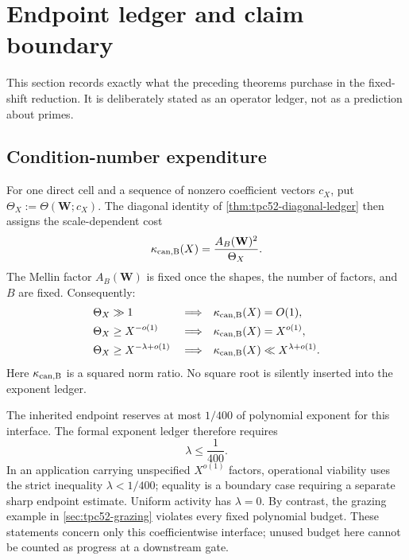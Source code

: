 \section{Endpoint ledger and claim boundary}
\label{sec:tpc52-endpoint}

This section records exactly what the preceding theorems purchase in the
fixed-shift reduction.  It is deliberately stated as an operator ledger,
not as a prediction about primes.

\subsection{Condition-number expenditure}

For one direct cell and a sequence of nonzero coefficient vectors \(c_X\),
put \(\Theta_X:=\Theta(\mathbf W;c_X)\).  The diagonal identity of
\cref{thm:tpc52-diagonal-ledger} then assigns the scale-dependent cost
\begin{equation}
 \kappa_{\rm can,B}(X)
 =\frac{A_B(\mathbf W)^2}{\Theta_X}.
 \label{eq:tpc52-endpoint-exact-cost}
\end{equation}
The Mellin factor \(A_B(\mathbf W)\) is fixed once the shapes, the
number of factors, and \(B\) are fixed.  Consequently:
\begin{align}
 \Theta_X&\gg 1
   &&\Longrightarrow& \kappa_{\rm can,B}(X)&=O(1),
 \label{eq:tpc52-endpoint-constant-cost}\\
 \Theta_X&\ge X^{-o(1)}
   &&\Longrightarrow& \kappa_{\rm can,B}(X)&=X^{o(1)},
 \label{eq:tpc52-endpoint-subpower-cost}\\
 \Theta_X&\ge X^{-\lambda+o(1)}
   &&\Longrightarrow& \kappa_{\rm can,B}(X)&\ll X^{\lambda+o(1)}.
 \label{eq:tpc52-endpoint-power-cost}
\end{align}
Here \(\kappa_{\rm can,B}\) is a squared norm ratio.  No square root is
silently inserted into the exponent ledger.

The inherited endpoint reserves at most \(1/400\) of polynomial
exponent for this interface.  The formal exponent ledger therefore requires
\begin{equation}
 \lambda\le \frac1{400}.
 \label{eq:tpc52-endpoint-budget}
\end{equation}
In an application carrying unspecified \(X^{o(1)}\) factors, operational
viability uses the strict inequality \(\lambda<1/400\); equality is a
boundary case requiring a separate sharp endpoint estimate.
Uniform activity has \(\lambda=0\).  By contrast, the grazing example
in \cref{sec:tpc52-grazing} violates every fixed polynomial budget.
These statements concern only this coefficientwise interface; unused
budget here cannot be counted as progress at a downstream gate.

